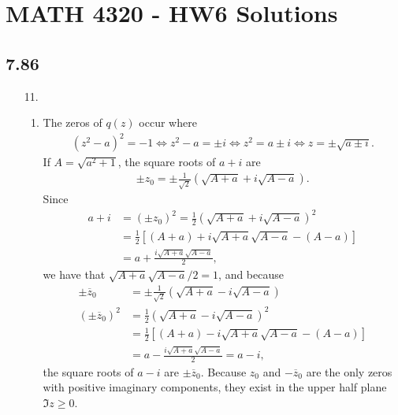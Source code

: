 \documentclass[a4paper,12pt]{article}
\begin{document}
\section*{MATH 4320 - HW6 Solutions}
\subsection*{7.86}
\begin{enumerate}
    \item[11.]
        \begin{enumerate}
            \item
                The zeros of $q(z)$ occur where
                \begin{gather*}
                    (z^2 - a)^2 = -1
                    \Leftrightarrow z^2 - a = \pm i
                    \Leftrightarrow z^2 = a \pm i
                    \Leftrightarrow z = \pm \sqrt{a \pm i}.
                \end{gather*}
                If $A = \sqrt{a^2 + 1}$, the square roots of $a + i$ are
                \begin{gather*}
                    \pm z_0 = \pm \frac{1}{\sqrt{2}}(\sqrt{A + a} + i\sqrt{A - a}).
                \end{gather*}
                Since
                \begin{align*}
                    a + i &= (\pm z_0)^2 = \frac{1}{2} \left( \sqrt{A + a} + i\sqrt{A - a} \right)^2 \\
                    &= \frac{1}{2} \left[ (A + a) + i\sqrt{A + a}\sqrt{A - a} - (A - a) \right] \\
                    &= a + \frac{i\sqrt{A + a} \sqrt{A - a}}{2},
                \end{align*}
                we have that $\sqrt{A + a}\sqrt{A - a}/2 = 1$, and because
                \begin{align*}
                    \pm \overline{z}_0 &= \pm \frac{1}{\sqrt{2}}(\sqrt{A + a} - i\sqrt{A - a}) \\
                    (\pm \overline{z}_0)^2 &= \frac{1}{2} \left( \sqrt{A + a} - i\sqrt{A - a} \right)^2 \\
                    &= \frac{1}{2} \left[ (A + a) - i\sqrt{A + a}\sqrt{A - a} - (A - a) \right] \\
                    &= a - \frac{i\sqrt{A + a} \sqrt{A - a}}{2} = a - i,
                \end{align*}
                the square roots of $a - i$ are $\pm \overline{z}_0$. Because $z_0$ and $-\overline{z}_0$ are the only zeros with positive imaginary components, they exist in the upper half plane $\Im z \geq 0$.


\end{enumerate}
\end{enumerate}
\end{document}
